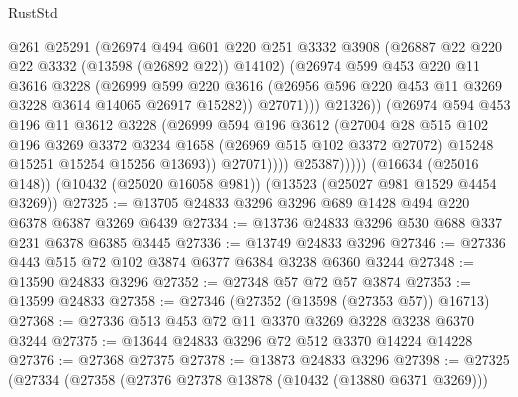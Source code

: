 \begin{lexlean}{RustStd}
\begin{coremodule}
                          @261
                          @25291
                          (@26974
                            @494
                            @601
                            @220
                            @251
                            @3332
                            @3908
                            (@26887 @22 @220 @22 @3332 (@13598 (@26892 @22)) @14102)
                            (@26974
                              @599
                              @453
                              @220
                              @11
                              @3616
                              @3228
                              (@26999
                                @599
                                @220
                                @3616
                                (@26956 @596 @220 @453 @11 @3269 @3228 @3614 @14065 @26917 @15282))
                              @27071)))
                        @21326))
                    (@26974
                      @594
                      @453
                      @196
                      @11
                      @3612
                      @3228
                      (@26999
                        @594
                        @196
                        @3612
                        (@27004
                          @28
                          @515
                          @102
                          @196
                          @3269
                          @3372
                          @3234
                          @1658
                          (@26969 @515 @102 @3372 @27072)
                          @15248
                          @15251
                          @15254
                          @15256
                          @13693))
                      @27071))))
              @25387)))))
    (@16634 (@25016 @148))
    (@10432 (@25020 @16058 @981))
    (@13523 (@25027 @981 @1529 @4454 @3269))
@27325 := @13705 @24833 @3296 @3296 @689 @1428 @494 @220 @6378 @6387 @3269 @6439
@27334 := @13736 @24833 @3296 @530 @688 @337 @231 @6378 @6385 @3445
@27336 := @13749 @24833 @3296
@27346 := @27336 @443 @515 @72 @102 @3874 @6377 @6384 @3238 @6360 @3244
@27348 := @13590 @24833 @3296
@27352 := @27348 @57 @72 @57 @3874
@27353 := @13599 @24833
@27358 := @27346 (@27352 (@13598 (@27353 @57)) @16713)
@27368 := @27336 @513 @453 @72 @11 @3370 @3269 @3228 @3238 @6370 @3244
@27375 := @13644 @24833 @3296 @72 @512 @3370 @14224 @14228
@27376 := @27368 @27375
@27378 := @13873 @24833 @3296
@27398 := @27325
    (@27334
      (@27358
        (@27376 @27378 @13878 (@10432 (@13880 @6371 @3269)))

\end{coremodule}
\end{lexlean}
